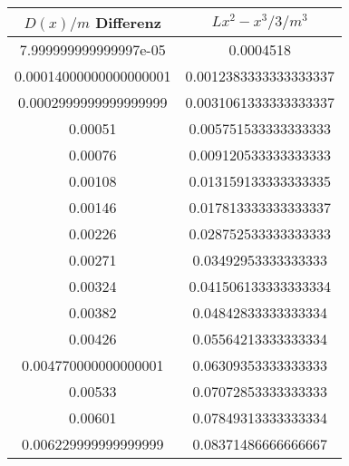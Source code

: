 \begin{table}\caption{}
\label{}
\centering
{}
\begin{tabular}{S[]S[]} 
\toprule
{$D(x)/m$ Differenz} & {$Lx^2-x^3/3 /m^3$}\\
\midrule
7.999999999999997e-05 & 0.0004518\\
0.00014000000000000001 & 0.0012383333333333337\\
0.0002999999999999999 & 0.0031061333333333337\\
0.00051 & 0.005751533333333333\\
0.00076 & 0.009120533333333333\\
0.00108 & 0.013159133333333335\\
0.00146 & 0.017813333333333337\\
0.00226 & 0.028752533333333333\\
0.00271 & 0.03492953333333333\\
0.00324 & 0.041506133333333334\\
0.00382 & 0.04842833333333334\\
0.00426 & 0.05564213333333334\\
0.004770000000000001 & 0.06309353333333333\\
0.00533 & 0.07072853333333333\\
0.00601 & 0.07849313333333334\\
0.006229999999999999 & 0.08371486666666667\\
\bottomrule
\end{tabular}\end{table}